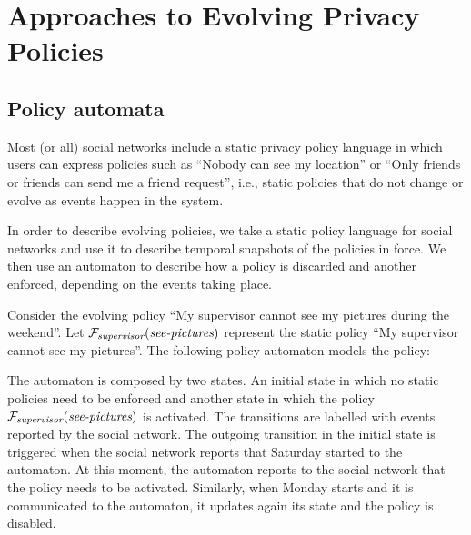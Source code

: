 \vspace{-2mm}
\section{Approaches to Evolving Privacy Policies}

\subsection{Policy automata}

Most (or all) social networks include a static privacy policy language in which users can express policies such as ``Nobody can see my location'' or ``Only friends or friends can send me a friend request'', i.e., static policies that do not change or evolve as events happen in the system.

In order to describe evolving policies, we take a static policy language for social networks and use it to describe temporal snapshots of the policies in force. We then use an automaton to describe how a policy is discarded and another enforced, depending on the events taking place.

\begin{example}

Consider the evolving policy ``My supervisor cannot see my pictures during the weekend''. Let ${\mathcal F}_{\textit{supervisor}}(\textit{see-pictures})$ represent the static policy ``My supervisor cannot see my pictures''. The following policy automaton models the policy:

\centerline{}

The automaton is composed by two states. An initial state in which no static policies need to be enforced and another state in which the policy ${\mathcal F}_{\textit{supervisor}}(\textit{see-pictures})$ is activated. The transitions are labelled with events reported by the social network. The outgoing transition in the initial state is triggered when the social network reports that Saturday started to the automaton. At this moment, the automaton reports to the social network that the policy needs to be activated. Similarly, when Monday starts and it is communicated to the automaton, it updates again its state and the policy is disabled.
\end{example}

